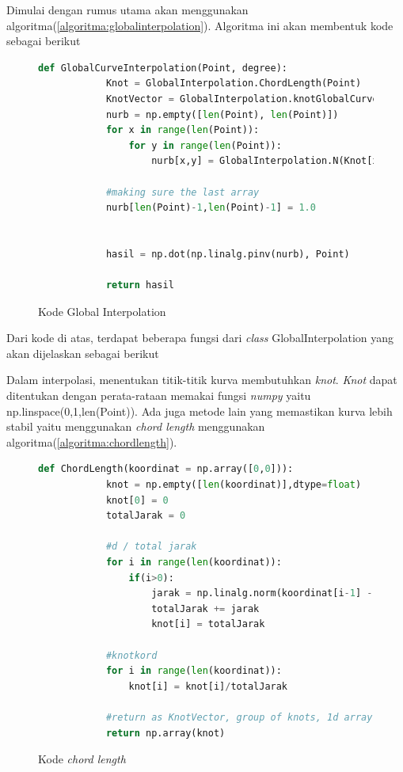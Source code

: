 Dimulai dengan rumus utama akan menggunakan 
algoritma(\ref{algoritma:globalinterpolation}). 
Algoritma ini akan membentuk kode sebagai berikut
\begin{figure}[H]
	\centering
	\begin{lstlisting}[language=Python, basicstyle=\tiny]
		def GlobalCurveInterpolation(Point, degree):
			Knot = GlobalInterpolation.ChordLength(Point)
			KnotVector = GlobalInterpolation.knotGlobalCurve(Knot, degree)
			nurb = np.empty([len(Point), len(Point)])
			for x in range(len(Point)):
				for y in range(len(Point)):
					nurb[x,y] = GlobalInterpolation.N(Knot[x], y, degree, KnotVector)

			#making sure the last array
			nurb[len(Point)-1,len(Point)-1] = 1.0

		
			hasil = np.dot(np.linalg.pinv(nurb), Point)

			return hasil
	\end{lstlisting}
	\caption{Kode Global Interpolation}
	\label{kode:GlobalInterpolation}
\end{figure}
Dari kode di atas, terdapat beberapa fungsi 
dari \textit{class} GlobalInterpolation yang 
akan dijelaskan sebagai berikut

Dalam interpolasi, menentukan titik-titik kurva 
membutuhkan \textit{knot}. \textit{Knot} dapat 
ditentukan dengan perata-rataan memakai fungsi 
\textit{numpy} yaitu np.linspace(0,1,len(Point)).
Ada juga metode lain yang memastikan kurva lebih 
stabil yaitu menggunakan \textit{chord length} 
menggunakan algoritma(\ref{algoritma:chordlength}).
\begin{figure}[H]
	\centering
	\begin{lstlisting}[language=Python, basicstyle=\tiny]
		def ChordLength(koordinat = np.array([0,0])):
			knot = np.empty([len(koordinat)],dtype=float)
			knot[0] = 0
			totalJarak = 0

			#d / total jarak
			for i in range(len(koordinat)):
				if(i>0):
					jarak = np.linalg.norm(koordinat[i-1] - koordinat[i])
					totalJarak += jarak
					knot[i] = totalJarak
		
			#knotkord
			for i in range(len(koordinat)):
				knot[i] = knot[i]/totalJarak

			#return as KnotVector, group of knots, 1d array
        	return np.array(knot)
	\end{lstlisting}
	\caption{Kode \textit{chord length}}
	\label{kode:chordlength}
\end{figure}

